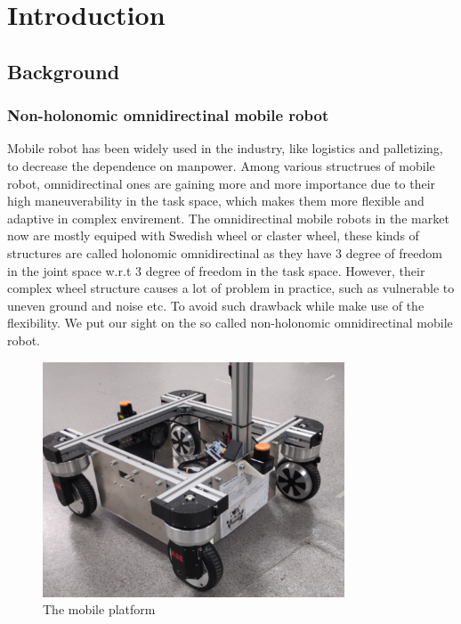 \chapter{Introduction}
\label{cha:introduction}

\section{Background}
\label{sec:background}
\subsection{Non-holonomic omnidirectinal mobile robot}
Mobile robot has been widely used in the industry, like logistics and palletizing, to decrease the dependence on manpower. Among various structrues of mobile robot, omnidirectinal ones are gaining more and more 
importance due to their high maneuverability in the task space, which makes them more flexible and adaptive in complex envirement. The omnidirectinal mobile robots in the market now are mostly equiped with 
Swedish wheel or claster wheel, these kinds of structures are called holonomic omnidirectinal as they have 3 degree of freedom in the joint space w.r.t 3 degree of freedom in the task space. However, their complex 
wheel structure causes a lot of problem in practice, such as vulnerable to uneven ground and noise etc. To avoid such drawback while make use of the flexibility. We put our sight on the so called non-holonomic 
omnidirectinal mobile robot. 
\begin{figure}[H]\label{fig:mobilePlatform}
    \centering
    \includegraphics[width=0.8\textwidth]{Figures/mobilePlatform.jpg}
    \caption{The mobile platform}
    \label{fig:mobilePlatform}
\end{figure}

